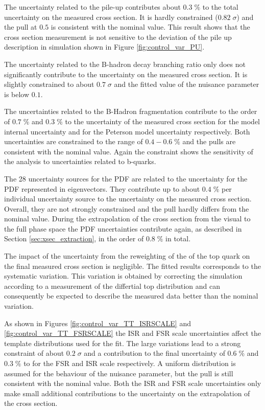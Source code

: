 The uncertainty related to the pile-up contributes about $0.3 \; \%$ to the total uncertainty on the measured cross section. It is hardly constrained  ($0.82 \; \sigma$) and the pull at $0.5$ is consistent with the nominal value.
This result shows that the cross section measurement is not sensitive to the deviation of the pile up description in simulation shown in Figure \ref{fig:control_var_PU}.

The uncertainty related to the B-hadron decay branching ratio only does not significantly contribute to the uncertainty on the measured cross section. It is slightly constrained to about $0.7 \; \sigma$ and the fitted value of the nuisance parameter is below $0.1$.

The uncertainties related to the B-Hadron fragmentation contribute to the order of $0.7 \; \%$ and $0.3 \; \%$ to the uncertainty of the measured cross section for the model internal uncertainty and for the Peterson model uncertainty respectively.
Both uncertainties are constrained to the range of $0.4 - 0.6 \; \%$ and the pulls are consistent with the nominal value. 
Again the constraint shows the sensitivity of the analysis to uncertainties related to b-quarks.

The 28 uncertainty sources for the PDF are related to the uncertainty for the PDF represented in eigenvectors.
They contribute up to about $0.4 \; \%$ per individual uncertainty source to the uncertainty on the measured cross section. Overall, they are not strongly constrained and the pull hardly differs from the nominal value.
During the extrapolation of the cross section from the visual to the full phase space the PDF uncertainties contribute again, as described in Section \ref{sec:xsec_extraction}, in the order of $0.8 \; \%$ in total.

The impact of the uncertainty from the reweighting of the \pt of the top quark on the final measured cross section is negligible.
The fitted results corresponds to the systematic variation. This variation is obtained by correcting the simulation according to a measurement of the differtial top \pt distribution and can consequently
be expected to describe the measured data better than the nominal variation.



As shown in Figures \ref{fig:control_var_TT_ISRSCALE} and \ref{fig:control_var_TT_FSRSCALE} the ISR and FSR scale uncertainties affect the template distributions used for the fit.
The large variations lead to a strong constraint of about $0.2 \; \sigma$ and a contribution to the final uncertainty of $0.6 \;\%$ and $0.3 \; \%$ to for the FSR and ISR scale respectively.
A uniform distribution is assumed for the behaviour of the nuisance parameter, but the pull is still consistent with the nominal value.
Both the ISR and FSR scale uncertainties only make small additional contributions to the uncertainty on the extrapolation of the cross section.

